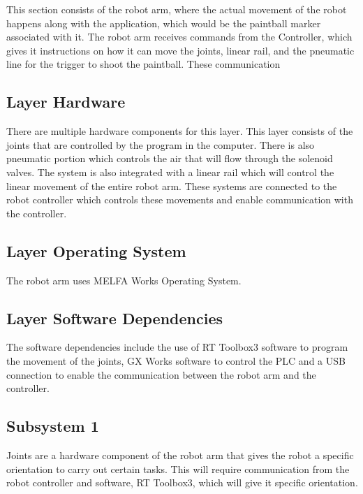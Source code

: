 This section consists of the robot arm, where the actual movement of the robot happens along with the application, which would be the paintball marker associated with it. The robot arm receives commands from the Controller, which gives it instructions on how it can move the joints, linear rail, and the pneumatic line for the trigger to shoot the paintball. These communication 


\subsection{Layer Hardware}
There are multiple hardware components for this layer. This layer consists of the joints that are controlled by the program in the computer. There is also pneumatic portion which controls the air that will flow through the solenoid valves. The system is also integrated with a linear rail which will control the linear movement of the entire robot arm. These systems are connected to the robot controller which controls these movements and enable communication with the controller.

\subsection{Layer Operating System}
The robot arm uses MELFA Works Operating System.

\subsection{Layer Software Dependencies}
The software dependencies include the use of RT Toolbox3 software to program the movement of the joints, GX Works software to control the PLC and a USB connection to enable the communication between the robot arm and the controller. 

\subsection{Subsystem 1}
Joints are a hardware component of the robot arm that gives the robot a specific orientation to carry out certain tasks. This will require communication from the robot controller and software, RT Toolbox3, which will give it specific orientation.

